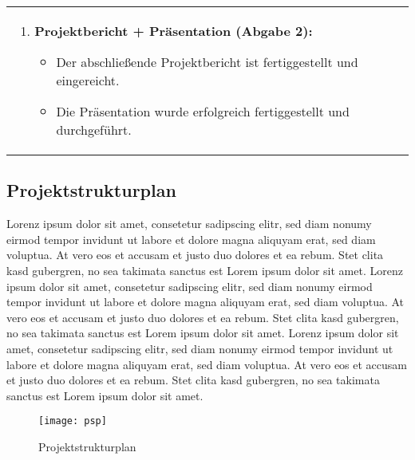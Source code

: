 \begin{tabularx}{\textwidth}{L R}
\begin{enumerate}[left=0pt,label=\arabic*.]
        \item \textbf{Projektbericht + Präsentation (Abgabe 2):}
        \begin{itemize}[label=--]
            \item Der abschließende Projektbericht ist fertiggestellt und eingereicht.
            \item Die Präsentation wurde erfolgreich fertiggestellt und durchgeführt.
        \end{itemize}
    \end{enumerate}
    &
\end{tabularx}


\subsection{Projektstrukturplan}\label{subsec:projektstrukturplan}
Lorenz ipsum dolor sit amet, consetetur sadipscing elitr, sed diam nonumy eirmod tempor invidunt ut labore et dolore magna aliquyam erat, sed diam voluptua.
At vero eos et accusam et justo duo dolores et ea rebum.
Stet clita kasd gubergren, no sea takimata sanctus est Lorem ipsum dolor sit amet.
Lorenz ipsum dolor sit amet, consetetur sadipscing elitr, sed diam nonumy eirmod tempor invidunt ut labore et dolore magna aliquyam erat, sed diam voluptua.
At vero eos et accusam et justo duo dolores et ea rebum.
Stet clita kasd gubergren, no sea takimata sanctus est Lorem ipsum dolor sit amet.
Lorenz ipsum dolor sit amet, consetetur sadipscing elitr, sed diam nonumy eirmod tempor invidunt ut labore et dolore magna aliquyam erat, sed diam voluptua.
At vero eos et accusam et justo duo dolores et ea rebum.
Stet clita kasd gubergren, no sea takimata sanctus est Lorem ipsum dolor sit amet.

\begin{figure}[H]
    \centering
    \texttt{[image: psp]}
    \caption{Projektstrukturplan}\label{fig:projektstrukturplan}
\end{figure}